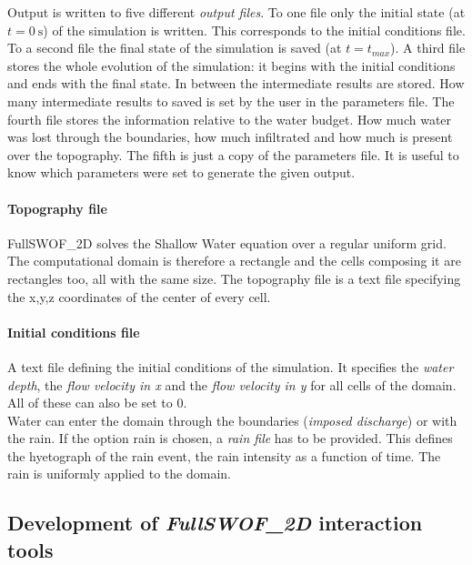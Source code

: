 Output is written to five different \emph{output files}.
To one file only the initial state (at $t = \SI{0}{\s}$) of the simulation is written.
This corresponds to the initial conditions file.
To a second file the final state of the simulation is saved (at $t = t_{max}$).
A third file stores the whole evolution of the simulation: it begins with the initial conditions and ends with the final state.
In between the intermediate results are stored.
How many intermediate results to saved is set by the user in the parameters file.
The fourth file stores the information relative to the water budget.
How much water was lost through the boundaries, how much infiltrated and how much is present over the topography.
The fifth is just a copy of the parameters file.
It is useful to know which parameters were set to generate the given output.

\paragraph{Topography file} FullSWOF\_2D solves the Shallow Water equation over a regular uniform grid. The computational domain is therefore a rectangle and the cells composing it are rectangles too, all with the same size. The topography file is a text file specifying the x,y,z coordinates of the center of every cell.

\paragraph{Initial conditions file} A text file defining the initial conditions of the simulation. It specifies the \emph{water depth}, the \emph{flow velocity in x} and the \emph{flow velocity in y} for all cells of the domain. All of these can also be set to \num{0}.\\

Water can enter the domain through the boundaries (\emph{imposed discharge}) or with the rain. If the option rain is chosen, a \emph{rain file} has to be provided. This defines the hyetograph of the rain event, the rain intensity as a function of time. The rain is uniformly applied to the domain.


\subsection{Development of \textit{FullSWOF\_2D} interaction tools}
\label{sec:fswof_interaction_tools}



